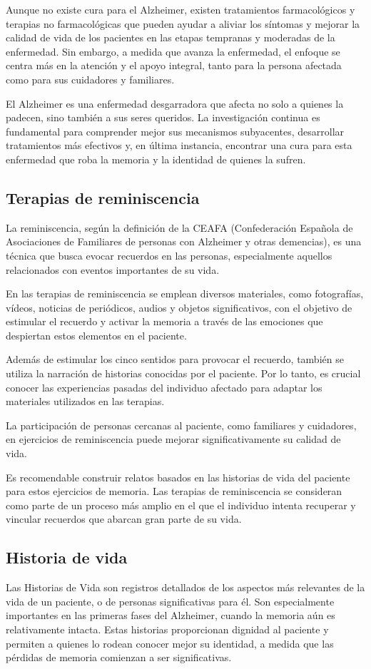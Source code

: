 Aunque no existe cura para el Alzheimer, existen tratamientos farmacológicos y terapias no farmacológicas que pueden ayudar a aliviar los síntomas y mejorar la calidad de vida de los pacientes en las etapas tempranas y moderadas de la enfermedad. Sin embargo, a medida que avanza la enfermedad, el enfoque se centra más en la atención y el apoyo integral, tanto para la persona afectada como para sus cuidadores y familiares.

El Alzheimer es una enfermedad desgarradora que afecta no solo a quienes la padecen, sino también a sus seres queridos. La investigación continua es fundamental para comprender mejor sus mecanismos subyacentes, desarrollar tratamientos más efectivos y, en última instancia, encontrar una cura para esta enfermedad que roba la memoria y la identidad de quienes la sufren.
\subsection{Terapias de reminiscencia}
La reminiscencia, según la definición de la CEAFA (Confederación Española de Asociaciones de Familiares de personas con Alzheimer y otras demencias), es una técnica que busca evocar recuerdos en las personas, especialmente aquellos relacionados con eventos importantes de su vida.

En las terapias de reminiscencia se emplean diversos materiales, como fotografías, vídeos, noticias de periódicos, audios y objetos significativos, con el objetivo de estimular el recuerdo y activar la memoria a través de las emociones que despiertan estos elementos en el paciente.

Además de estimular los cinco sentidos para provocar el recuerdo, también se utiliza la narración de historias conocidas por el paciente. Por lo tanto, es crucial conocer las experiencias pasadas del individuo afectado para adaptar los materiales utilizados en las terapias.

La participación de personas cercanas al paciente, como familiares y cuidadores, en ejercicios de reminiscencia puede mejorar significativamente su calidad de vida.

Es recomendable construir relatos basados en las historias de vida del paciente para estos ejercicios de memoria. Las terapias de reminiscencia se consideran como parte de un proceso más amplio en el que el individuo intenta recuperar y vincular recuerdos que abarcan gran parte de su vida.
\subsection{Historia de vida}
Las Historias de Vida son registros detallados de los aspectos más relevantes de la vida de un paciente, o de personas significativas para él. Son especialmente importantes en las primeras fases del Alzheimer, cuando la memoria aún es relativamente intacta. Estas historias proporcionan dignidad al paciente y permiten a quienes lo rodean conocer mejor su identidad, a medida que las pérdidas de memoria comienzan a ser significativas.

